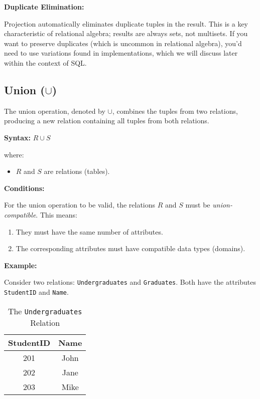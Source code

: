 \documentclass[12pt]{book}
\begin{document}
\textbf{Duplicate Elimination:}

Projection automatically eliminates duplicate tuples in the result. This is a key characteristic of relational algebra; results are always sets, not multisets. If you want to preserve duplicates (which is uncommon in relational algebra), you'd need to use variations found in implementations, which we will discuss later within the context of SQL.

\subsection{Union ($\cup$)}

The union operation, denoted by $\cup$, combines the tuples from two relations, producing a new relation containing all tuples from both relations.

\textbf{Syntax:} $\mathit{R} \cup \mathit{S}$

where:
\begin{itemize}
    \item $\mathit{R}$ and $\mathit{S}$ are relations (tables).
\end{itemize}

\textbf{Conditions:}

For the union operation to be valid, the relations $\mathit{R}$ and $\mathit{S}$ must be \emph{union-compatible}. This means:

\begin{enumerate}
    \item They must have the same number of attributes.
    \item The corresponding attributes must have compatible data types (domains).
\end{enumerate}

\textbf{Example:}

Consider two relations: \texttt{Undergraduates} and \texttt{Graduates}. Both have the attributes \texttt{StudentID} and \texttt{Name}.

\begin{table}[htbp]
\centering
\begin{tabular}{@{}cc@{}}
\toprule
StudentID & Name \\
\midrule
201 & John \\
202 & Jane \\
203 & Mike \\
\bottomrule
\end{tabular}
\caption{The \texttt{Undergraduates} Relation}
\label{tab:undergraduates}
\end{table}
\end{document}
